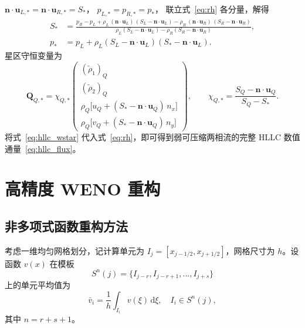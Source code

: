 \documentclass[12pt,a4paper]{article}
\numberwithin{equation}{section}    %
\begin{document}
$\bm{n} \cdot \bm{u}_{L,*} = \bm{n} \cdot \bm{u}_{R,*} = S_*$，
$p_{L,*} = p_{R,*} = p_*$，
联立式~\eqref{eq:rh} 各分量，解得
\begin{equation}
    \begin{aligned}
        S_* &= \frac{p_R - p_L
    + \rho_L\,(\bm{n} \cdot \bm{u}_L)\,(S_L - \bm{n} \cdot \bm{u}_L)
    - \rho_R\,(\bm{n} \cdot \bm{u}_R)\,(S_R - \bm{n} \cdot \bm{u}_R)}
    {\rho_L(S_L - \bm{n} \cdot \bm{u}_L) - \rho_R(S_R - \bm{n} \cdot \bm{u}_R)}, \\ 
    p_* &= p_L + \rho_L(S_L - \bm{n} \cdot \bm{u}_L)(S_* - \bm{n} \cdot \bm{u}_L).
    \end{aligned}
\end{equation}
星区守恒变量为
\begin{equation}
    \label{eq:hllc_wstar}
    \bm{Q}_{Q,*} =
    \chi_{Q,*}
    \begin{pmatrix}
        (\tilde{\rho}_1)_Q                                          \\
        (\tilde{\rho}_2)_Q                                          \\
        \rho_Q\bigl[u_Q + (S_* - \bm{n} \cdot \bm{u}_Q)\, n_x\bigr] \\
        \rho_Q\bigl[v_Q + (S_* - \bm{n} \cdot \bm{u}_Q)\, n_y\bigr]
    \end{pmatrix},
    \qquad
    \chi_{Q,*} = \frac{S_Q - \bm{n} \cdot \bm{u}_Q}{S_Q - S_*}.
\end{equation}
将式~\eqref{eq:hllc_wstar} 代入式~\eqref{eq:rh}，即可得到弱可压缩两相流的完整 HLLC 数值通量~\eqref{eq:hllc_flux}。

\cleardoublepage
\section{高精度 WENO 重构}

\subsection{非多项式函数重构方法}
\label{sec:recon}
考虑一维均匀网格划分，记计算单元为 $I_j = [x_{j-1/2}, x_{j+1/2}]$，网格尺寸为 $h$。设函数 $v(x)$ 在模板
\begin{equation}
    S^n(j) = \{I_{j-r}, I_{j-r+1}, \ldots, I_{j+s}\}
\end{equation}
上的单元平均值为
\begin{equation}
    \bar{v}_i = \frac{1}{h}\int_{I_i} v(\xi)\,\mathrm{d}\xi, \quad I_i \in S^n(j),
\end{equation}
其中 $n = r + s + 1$。
\end{document}

